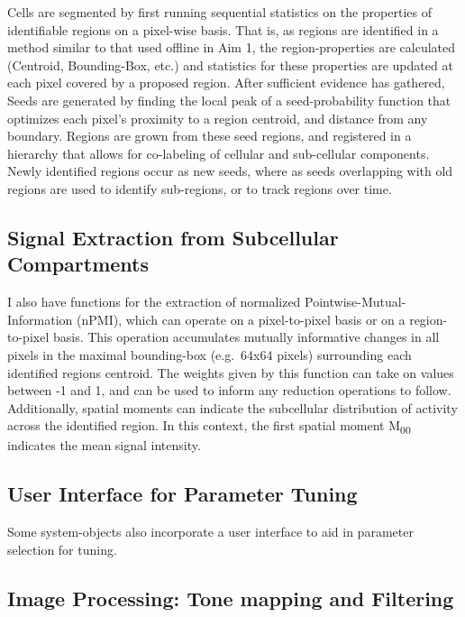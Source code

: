 Cells are segmented by first running sequential statistics on the
properties of identifiable regions on a pixel-wise basis. That is, as
regions are identified in a method similar to that used offline in Aim
1, the region-properties are calculated (Centroid, Bounding-Box, etc.)
and statistics for these properties are updated at each pixel covered by
a proposed region. After sufficient evidence has gathered, Seeds are
generated by finding the local peak of a seed-probability function that
optimizes each pixel's proximity to a region centroid, and distance from
any boundary. Regions are grown from these seed regions, and registered
in a hierarchy that allows for co-labeling of cellular and sub-cellular
components. Newly identified regions occur as new seeds, where as seeds
overlapping with old regions are used to identify sub-regions, or to
track regions over time.

\subsection{Signal Extraction from Subcellular
Compartments}\label{signal-extraction-from-subcellular-compartments}

I also have functions for the extraction of normalized
Pointwise-Mutual-Information (nPMI), which can operate on a
pixel-to-pixel basis or on a region-to-pixel basis. This operation
accumulates mutually informative changes in all pixels in the maximal
bounding-box (e.g.~64x64 pixels) surrounding each identified regions
centroid. The weights given by this function can take on values between
-1 and 1, and can be used to inform any reduction operations to follow.
Additionally, spatial moments can indicate the subcellular distribution
of activity across the identified region. In this context, the first
spatial moment M\textsubscript{00} indicates the mean signal intensity.

\subsection{User Interface for Parameter
Tuning}\label{user-interface-for-parameter-tuning}

Some system-objects also incorporate a user interface to aid in
parameter selection for tuning.

\subsection{Image Processing: Tone mapping and
Filtering}\label{image-processing-tonemapping-and-filtering}





